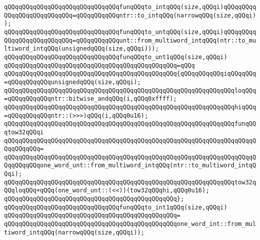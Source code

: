 \newline
\verb|qQQqqQQqqQQqqQQqqQQqqQQqqQQqqQQqfunqQQqto_intqQQq(size,qQQqi)qQQqqQQqqQQqqQQqqQQqqQQqqQQq=qQQqqQQqqQQqntr::to_intqQQq(narrowqQQq(size,qQQqi));|\newline
\verb|qQQqqQQqqQQqqQQqqQQqqQQqqQQqqQQqfunqQQqto_untqQQq(size,qQQqi)qQQqqQQqqQQqqQQqqQQqqQQqqQQq=qQQqqQQqqQQqunt::from_multiword_intqQQq(ntr::to_multiword_intqQQq(unsignedqQQq(size,qQQqi)));|\newline
\newline
\verb|qQQqqQQqqQQqqQQqqQQqqQQqqQQqqQQqfunqQQqto_unt1qQQq(size,qQQqi)|\newline
\verb|qQQqqQQqqQQqqQQqqQQqqQQqqQQqqQQqqQQqqQQqqQQqqQQq=qQQq|\newline
\verb|qQQqqQQqqQQqqQQqqQQqqQQqqQQqqQQqqQQqqQQqqQQqqQQq{qQQqqQQqqQQqiqQQqqQQq=qQQqqQQqqQQqunsignedqQQq(size,qQQqi);|\newline
\verb|qQQqqQQqqQQqqQQqqQQqqQQqqQQqqQQqqQQqqQQqqQQqqQQqqQQqqQQqqQQqqQQqloqQQq=qQQqqQQqqQQqntr::bitwise_andqQQq(i,qQQq0xffff);|\newline
\verb|qQQqqQQqqQQqqQQqqQQqqQQqqQQqqQQqqQQqqQQqqQQqqQQqqQQqqQQqqQQqqQQqhiqQQq=qQQqqQQqqQQqntr::(>>>)qQQq(i,qQQq0u16);|\newline
\newline
\verb|qQQqqQQqqQQqqQQqqQQqqQQqqQQqqQQqqQQqqQQqqQQqqQQqqQQqqQQqqQQqqQQqfunqQQqtow32qQQqi|\newline
\verb|qQQqqQQqqQQqqQQqqQQqqQQqqQQqqQQqqQQqqQQqqQQqqQQqqQQqqQQqqQQqqQQqqQQqqQQqqQQqqQQq=|\newline
\verb|qQQqqQQqqQQqqQQqqQQqqQQqqQQqqQQqqQQqqQQqqQQqqQQqqQQqqQQqqQQqqQQqqQQqqQQqqQQqqQQqone_word_unt::from_multiword_intqQQq(ntr::to_multiword_intqQQqi);|\newline
\newline
\verb|qQQqqQQqqQQqqQQqqQQqqQQqqQQqqQQqqQQqqQQqqQQqqQQqqQQqqQQqqQQqqQQqtow32qQQqloqQQq+qQQq(one_word_unt::(<<))(tow32qQQqhi,qQQq0u16);|\newline
\verb|qQQqqQQqqQQqqQQqqQQqqQQqqQQqqQQqqQQqqQQqqQQqqQQq};|\newline
\newline
\verb|qQQqqQQqqQQqqQQqqQQqqQQqqQQqqQQqfunqQQqto_int1qQQq(size,qQQqi)|\newline
\verb|qQQqqQQqqQQqqQQqqQQqqQQqqQQqqQQqqQQqqQQqqQQqqQQq=|\newline
\verb|qQQqqQQqqQQqqQQqqQQqqQQqqQQqqQQqqQQqqQQqqQQqqQQqone_word_int::from_multiword_intqQQq(narrowqQQq(size,qQQqi));|\newline
\newline
